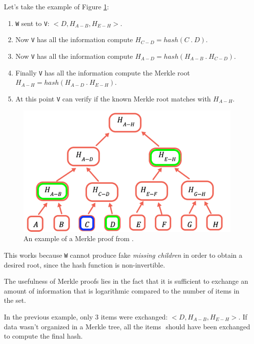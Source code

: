 \documentclass[12pt]{article}
\begin{document}
Let's take the example of Figure \ref{figure:merkle_proof}:
\begin{enumerate}
    \item \verb|W| sent to \verb|V|: \(<D, H_{A-B}, H_{E-H}>\).
    \item Now \verb|V| has all the information compute \(H_{C-D} = hash(C \: . \: D)\).
    \item Now \verb|V| has all the information compute \(H_{A-D} = hash(H_{A-B} \: . \: H_{C-D})\).
    \item Finally \verb|V| has all the information compute the Merkle root \(H_{A-H} = hash(H_{A-D} \: . \: H_{E-H})\).
    \item At this point \verb|V| can verify if the known Merkle root matches with \(H_{A-H}\).
\end{enumerate}

\begin{figure}[ht]
    \centering
    \includegraphics[width=\textwidth]{merkle_proof} 
    \caption{An example of a Merkle proof from \cite{ethereum_merkle_proof}.}
    \label{figure:merkle_proof}
\end{figure}

This works because \verb|W| cannot produce fake \textit{missing children} in order to obtain a desired root, since the hash function is non-invertible.

The usefulness of Merkle proofs lies in the fact that it is sufficient to exchange an amount of information that is logarithmic compared to the number of items in the set.

In the previous example, only 3 items were exchanged: \(<D, H_{A-B}, H_{E-H}>\). If data wasn't organized in a Merkle tree, all the items \(<A, B, D, E, F, G, H>\) should have been exchanged to compute the final hash. 

\newpage


\end{document}
